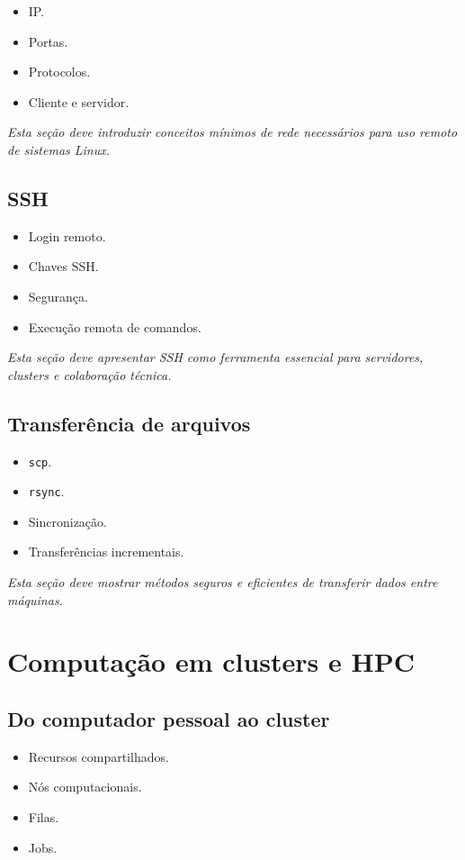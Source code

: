 \documentclass[12pt,openany]{book}
\newcommand{\placeholder}[1]{
    \par\medskip
    \noindent\textit{#1}
    \par\medskip
}
\newcommand{\topicos}[1]{
    \begin{itemize}
        #1
    \end{itemize}
}
\begin{document}
\begin{refsection}
\topicos{
    \item IP.
    \item Portas.
    \item Protocolos.
    \item Cliente e servidor.
}

\placeholder{Esta seção deve introduzir conceitos mínimos de rede necessários para uso remoto de sistemas Linux.}

\section{SSH}

\topicos{
    \item Login remoto.
    \item Chaves SSH.
    \item Segurança.
    \item Execução remota de comandos.
}

\placeholder{Esta seção deve apresentar SSH como ferramenta essencial para servidores, clusters e colaboração técnica.}

\section{Transferência de arquivos}

\topicos{
    \item \texttt{scp}.
    \item \texttt{rsync}.
    \item Sincronização.
    \item Transferências incrementais.
}

\placeholder{Esta seção deve mostrar métodos seguros e eficientes de transferir dados entre máquinas.}

\chapter{Computação em clusters e HPC}

\section{Do computador pessoal ao cluster}

\topicos{
    \item Recursos compartilhados.
    \item Nós computacionais.
    \item Filas.
    \item Jobs.
}


\end{refsection}
\end{document}
